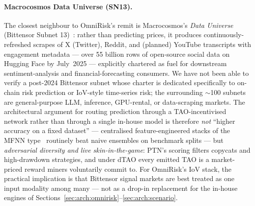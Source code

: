 \documentclass[11pt,a4paper]{article}
\begin{document}
\paragraph{Macrocosmos Data Universe (SN13).} The closest neighbour to OmniRisk's remit
is Macrocosmos's \emph{Data Universe} (Bittensor Subnet 13)~\cite{macrocosmos2024datauniverse}:
rather than predicting prices, it produces continuously-refreshed scrapes of X
(Twitter), Reddit, and (planned) YouTube transcripts with engagement metadata --- over
55 billion rows of open-source social data on Hugging Face by July~2025 --- explicitly
chartered as fuel for downstream sentiment-analysis and financial-forecasting consumers.
We have not been able to verify a post-2024 Bittensor subnet whose charter is dedicated
specifically to on-chain risk prediction or IoV-style time-series risk; the surrounding
$\sim$100 subnets are general-purpose LLM, inference, GPU-rental, or data-scraping
markets. The architectural argument for routing prediction through a TAO-incentivised
network rather than through a single in-house model is therefore \emph{not} ``higher
accuracy on a fixed dataset'' --- centralised feature-engineered stacks of the MFNN
type~\cite{long2019deep} routinely beat naive ensembles on benchmark splits --- but
\emph{adversarial diversity and live skin-in-the-game}: PTN's scoring filters
copycats and high-drawdown strategies, and under dTAO every emitted TAO is a
market-priced reward miners voluntarily commit to. For OmniRisk's IoV stack, the
practical implication is that Bittensor signal markets are best treated as one input
modality among many --- not as a drop-in replacement for the in-house engines of
Sections~\ref{sec:arch:omnirisk}--\ref{sec:arch:scenario}.
\end{document}

